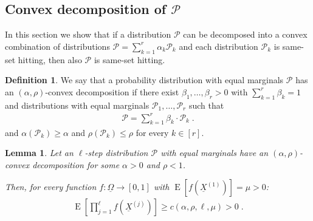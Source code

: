 \documentclass{daj}
\newcommand{\1}{\mathbbm{1}}
\theoremstyle{plain}
\newtheorem{lemma}[theorem]{Lemma}
\theoremstyle{definition}
\newtheorem{definition}[theorem]{Definition}
\DeclareMathOperator*{\EE}{E}
\newcommand{\cP}{\mathcal{P}}
\begin{document}
\subsection{Convex decomposition of 
\texorpdfstring{$\mathcal{P}$}{P}}

In this section we show that if a distribution $\mathcal{P}$ 
can be decomposed into a convex combination
of distributions $\mathcal{P} = \sum_{k=1}^{r} \alpha_k \cP_k$ and each 
distribution $\cP_k$ is same-set hitting, 
then also $\mathcal{P}$ is same-set hitting.

\begin{definition}
We say that a probability distribution with equal marginals $\cP$ has an
\emph{$(\alpha, \rho)$}-convex decomposition if there exist 
$\beta_1, \ldots, \beta_r > 0$ with $\sum_{k=1}^r \beta_k = 1$
and distributions with equal marginals
$\cP_1, \ldots, \cP_r$ such that
\begin{align*}
  \cP = \sum_{k=1}^r \beta_k \cdot \cP_k \; .
\end{align*}
and $\alpha(\cP_k) \ge \alpha$ and $\rho(\cP_k) \le \rho$ for every $k \in [r]$.
\end{definition}

\begin{lemma}
\label{lem:convex-decomposition}
Let an $\ell$-step distribution $\mathcal{P}$ with equal marginals have an
$(\alpha, \rho)$-convex decomposition
for some $\alpha > 0$ and $\rho < 1$. 

Then, for every function $f: \underline{\Omega} \to [0, 1]$ with 
$\EE[f(\underline{X}^{(1)})] = \mu > 0$:
\begin{align*}
  \EE \left[ \prod_{j=1}^\ell f(\underline{X}^{(j)}) \right] \ge 
c(\alpha, \rho, \ell, \mu) > 0 \; .
\end{align*}
\end{lemma}
\end{document}
